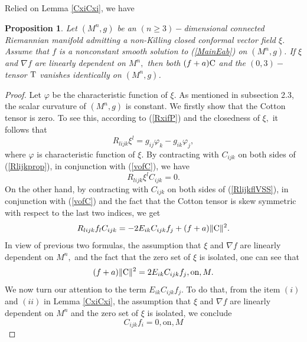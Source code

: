 \documentclass[10pt,leqno,oneside]{amsart}
\newtheorem{Prop}{Proposition}
\begin{document}
{        Relied on Lemma \ref{CxiCxi}, we have
    \begin{Prop}\label{ldCTzero}
        Let $(M^n, g)$ be an $(n\ge3)-$dimensional connected Riemannian manifold admitting a non-Killing closed conformal vector field $\xi.$ Assume that $f$ is a nonconstant smooth solution to {\rm(\ref{MainEab})} on $(M^n, g)$. If $\xi$ and $\nabla f$ are linearly dependent on $M^n,$ then both $(f+a){\rm C}$ and the $(0,3)-$tensor ${\rm T}$ vanishes identically on $(M^n, g)$.
    \end{Prop}
    \begin{proof}
        Let $\varphi$ be the characteristic function of $\xi.$ As mentioned in subsection 2.3, the scalar curvature of $(M^n, g)$ is constant. We firstly show that the Cotton tensor is zero. To see this, according to (\ref{RxifP}) and the closedness of $\xi,$ it follows that
       \begin{equation}\label{Rlijkprop}
         R_{lijk}\xi^l=g_{ij}\varphi_k-g_{ik}\varphi_j,
       \end{equation}
       where $\varphi$ is characteristic function of $\xi.$ By contracting with $C_{ijk}$ on both sides of (\ref{Rlijkprop}), in conjunction with (\ref{vofC}), we have
       \begin{equation*}
         R_{lijk}\xi^lC_{ijk}=0.
       \end{equation*}
       On the other hand, by contracting with $C_{ijk}$ on both sides of (\ref{RlijkflVSS}), in conjunction with (\ref{vofC}) and the fact that the Cotton tensor is skew symmetric with respect to the last two indices, we get
        \begin{equation*}
         R_{lijk}f_lC_{ijk}=-2E_{ik}C_{ijk}f_{j}+(f+a)\|{\rm C}\|^2.
       \end{equation*}
       In view of previous two formulas, the assumption that $\xi$ and $\nabla f$ are linearly dependent on $M^n,$ and the fact that the zero set of $\xi$ is isolated, one can see that
       \begin{equation}\label{CECf}
         (f+a)\|{\rm C}\|^2=2E_{ik}C_{ijk}f_{j}, \text{on}, M.
       \end{equation}
       We now turn our attention to the term $E_{ik}C_{ijk}f_{j}.$ To do that, from the item $(i)$ and $(ii)$ in Lemma \ref{CxiCxi}, the assumption that $\xi$ and $\nabla f$ are linearly dependent on $M^n$ and the zero set of $\xi$ is isolated, we conclude
       \begin{equation}\label{Cfzero}
         C_{ijk}f_i=0, \text{on}, M
       \end{equation}

\end{proof}}
\end{document}
